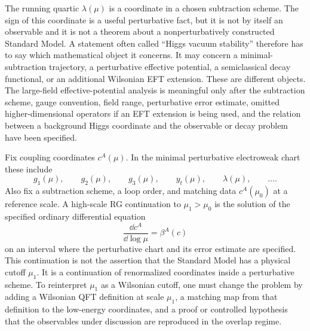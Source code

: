 The running quartic \(\lambda(\mu)\) is a coordinate in a chosen subtraction
scheme.  The sign of this coordinate is a useful perturbative fact, but it is
not by itself an observable and it is not a theorem about a nonperturbatively
constructed Standard Model.  A statement often called ``Higgs vacuum
stability'' therefore has to say which mathematical object it concerns.  It
may concern a minimal-subtraction trajectory, a perturbative effective
potential, a semiclassical decay functional, or an additional Wilsonian EFT
extension.  These are different objects.  The large-field effective-potential
analysis is meaningful only after the subtraction scheme, gauge convention,
field range, perturbative error estimate, omitted higher-dimensional
operators if an EFT extension is being used, and the relation between a
background Higgs coordinate and the observable or decay problem have been
specified.

\begin{definition}
\label{def:sm-high-scale-rg-continuation}
Fix coupling coordinates \(c^A(\mu)\).  In the minimal perturbative electroweak
chart these include
\[
  g_1(\mu),\qquad g_2(\mu),\qquad g_3(\mu),\qquad
  y_t(\mu),\qquad \lambda(\mu),\qquad \ldots .
\]
Also fix a subtraction scheme, a loop order, and matching data
\(c^A(\mu_0)\) at a reference scale.  A high-scale RG continuation to
\(\mu_1>\mu_0\) is the solution of the specified ordinary differential
equation
\begin{equation}
  \frac{\dd c^A}{\dd\log\mu}=\beta^A(c)
  \label{eq:sm-high-scale-rg-continuation-ode}
\end{equation}
on an interval where the perturbative chart and its error estimate are
specified.  This continuation is not the assertion that the Standard Model has
a physical cutoff \(\mu_1\).  It is a continuation of renormalized coordinates
inside a perturbative scheme.  To reinterpret \(\mu_1\) as a Wilsonian cutoff,
one must change the problem by adding a Wilsonian QFT definition at scale
\(\mu_1\), a matching map from that definition to the low-energy coordinates,
and a proof or controlled hypothesis that the observables under discussion are
reproduced in the overlap regime.
\end{definition}

